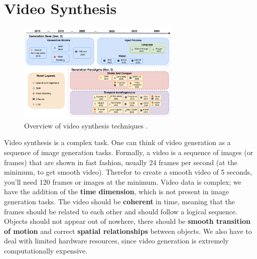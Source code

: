 \section{Video Synthesis}
\label{sec:video_synthesis}

\begin{figure}
    \centering
    \includegraphics[width=0.7\textwidth]{images/video_synthesis/techniques.png}
    \caption{Overview of video synthesis techniques \cite{long_video_survey}.}
    \label{fig:video_synthesis_techniques}
\end{figure}

Video synthesis is a complex task. One can think of video generation as a sequence of image generation tasks. Formally, a video is a sequence of images (or frames) that are shown in fast fashion, usually 24 frames per second (at the minimum, to get smooth video). Therefor to create a smooth video of 5 seconds, you'll need 120 frames or images at the minimum. Video data is complex; we have the addition of the \textbf{time dimension}, which is not present in image generation tasks. The video should be \textbf{coherent} in time, meaning that the frames should be related to each other and should follow a logical sequence. Objects should not appear out of nowhere, there should be \textbf{smooth transition of motion} and correct \textbf{spatial relationships} between objects. We also have to deal with limited hardware resources, since video generation is extremely computationally expensive.

% 



